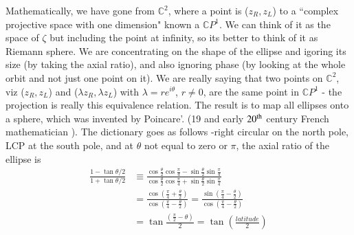 Mathematically, we have gone from $\mathbb{C}^2$, where a point is ($z_R , z_L$) to a ``complex projective space with one dimension" known a $\mathbb{C}P^1$. We can think of it
as the space of $\zeta$ but including the point at infinity, so its better to think of it
as Riemann sphere. We are concentrating on the shape of the ellipse and
igoring its size (by taking the axial ratio), and also ignoring phase (by looking
at the whole orbit and not just one point on it). We are really saying that two
points on $\mathbb{C}^2$, viz ($z_R , z_L$) and ($\lambda z_R , \lambda z_L$) with $\lambda = re^{i\theta}$, $r\neq 0$, are the same
point in $\mathbb{C}P^1$ - the projection is really this equivalence relation. The result is to
map all ellipses onto a sphere, which was invented by Poincare'. (19 and early
$20^{\rm th}$ century French mathematician ). The dictionary goes as follows -right circular on the north pole, LCP at the south pole, and at $\theta$ not equal to zero or
$\pi$, the axial ratio of the ellipse is
\begin{align*}
\frac{1-\tan \theta /2}{1+ \tan \theta /2} & \equiv \frac{\cos \frac{\theta}{2} \cos \frac{\pi}{4} - \sin \frac{\theta}{2} \sin \frac{\pi}{4}}{\cos \frac{\theta}{2} \cos \frac{\pi}{4} + \sin \frac{\theta}{2} \sin \frac{\pi}{4}}\\
& = \frac{\cos (\frac{\pi}{4} + \frac{\theta}{2})}{\cos (\frac{\pi}{4} - \frac{\theta}{2})} = \frac{\sin (\frac{\pi}{4} -\frac{\theta}{2})}{\cos (\frac{\pi}{4} - \frac{\theta }{2})}\\
& = \tan \frac{(\frac{\pi}{2} -\theta)}{2} = \tan \left(\frac{latitude}{2} \right)
\end{align*}

